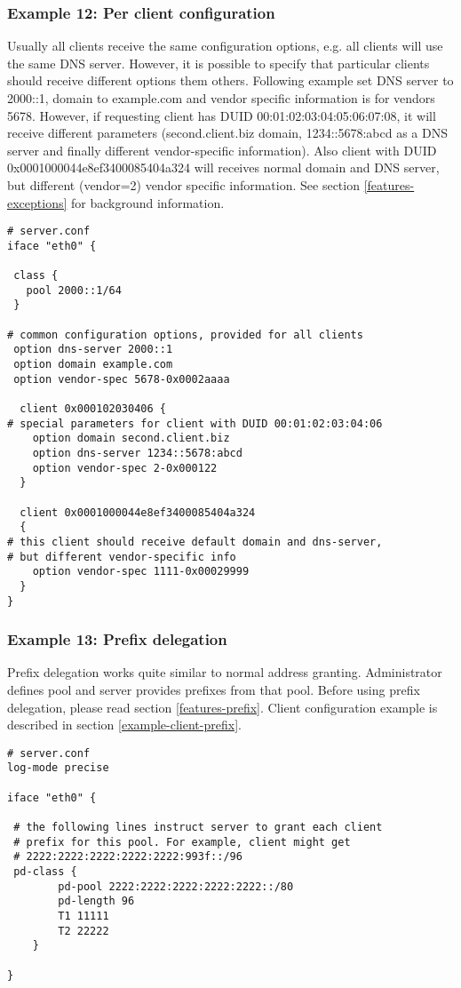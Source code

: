 \subsubsection{Example 12: Per client configuration}
\label{example-server-exceptions}
Usually all clients receive the same configuration options, e.g. all
clients will use the same DNS server. However, it is possible to
specify that particular clients should receive different options them
others. Following example set DNS server to 2000::1, domain
to example.com and vendor specific information is for vendors 5678.
However, if requesting client has DUID 00:01:02:03:04:05:06:07:08, it
will receive different parameters (second.client.biz domain,
1234::5678:abcd as a DNS server and finally different vendor-specific
information). Also client with DUID 0x0001000044e8ef3400085404a324
will receives normal domain and DNS server, but different (vendor=2)
vendor specific information. See section \ref{features-exceptions} for
background information.

\begin{lstlisting}
# server.conf
iface "eth0" {

 class {
   pool 2000::1/64
 }

# common configuration options, provided for all clients
 option dns-server 2000::1
 option domain example.com
 option vendor-spec 5678-0x0002aaaa
 
  client 0x000102030406 {
# special parameters for client with DUID 00:01:02:03:04:06      
	option domain second.client.biz
	option dns-server 1234::5678:abcd
	option vendor-spec 2-0x000122
  }

  client 0x0001000044e8ef3400085404a324
  {
# this client should receive default domain and dns-server, 
# but different vendor-specific info
	option vendor-spec 1111-0x00029999
  }
}
\end{lstlisting}

\subsubsection{Example 13: Prefix delegation}
\label{example-server-prefix}

Prefix delegation works quite similar to normal address granting.
Administrator defines pool and server provides prefixes from that
pool. Before using prefix delegation, please read section
\ref{features-prefix}. Client configuration example is described in section 
\ref{example-client-prefix}.

\begin{lstlisting}
# server.conf
log-mode precise

iface "eth0" {
 
 # the following lines instruct server to grant each client
 # prefix for this pool. For example, client might get
 # 2222:2222:2222:2222:2222:993f::/96
 pd-class {
        pd-pool 2222:2222:2222:2222:2222::/80
        pd-length 96
        T1 11111
        T2 22222
    }
 
}
\end{lstlisting}

